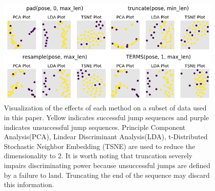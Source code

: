 \begin{figure}[htbp]
\begin{center}
\includegraphics[width=12cm]{images/pre_processing_results.png}
\end{center}
\caption{Visualization of the effects of each method on a subset of  data used in this paper. Yellow indicates successful jump sequences and purple indicates unsuccessful jump sequences. Principle Component Analysis(PCA), Lindear Discriminant Analysis(LDA), t-Distributed Stochastic Neighbor Embedding (TSNE) are used to reduce the dimensionality to 2. It is worth noting that truncation severely impairs discriminating power because unsuccessful jumps are defined by a failure to land. Truncating the end of the sequence may discard this information.}
\label{figure:pre_processing_results}
\end{figure}
